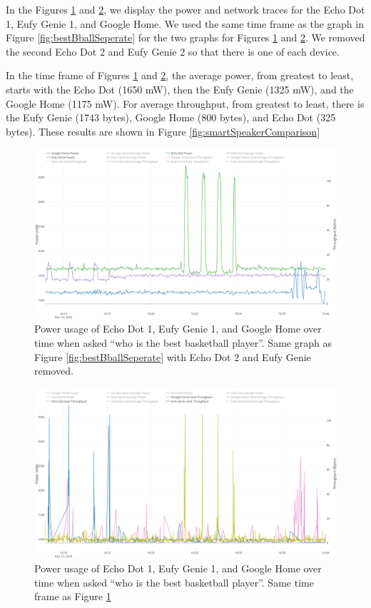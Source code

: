 In the Figures \ref{fig:smartSpeakerSeperate} and \ref{fig:smartSpeakerNetworkSeperate}, we display the power and network traces for the Echo Dot 1, Eufy Genie 1, and Google Home. We used the same time frame as the graph in Figure \ref{fig:bestBballSeperate} for the two graphs for Figures \ref{fig:smartSpeakerSeperate} and \ref{fig:smartSpeakerNetworkSeperate}. We removed the second Echo Dot 2 and Eufy Genie 2 so that there is one of each device.

In the time frame of Figures \ref{fig:smartSpeakerSeperate} and \ref{fig:smartSpeakerNetworkSeperate}, the average power, from greatest to least, starts with the Echo Dot (1650 mW), then the Eufy Genie (1325 mW), and the Google Home (1175 mW). For average throughput, from greatest to least, there is the Eufy Genie (1743 bytes), Google Home (800 bytes), and Echo Dot (325 bytes). These results are shown in Figure \ref{fig:smartSpeakerComparison}

\begin{figure}[H]
  \centering
  \includegraphics[width=1\textwidth]{figures/smartSpeakerSeperate.png}
  \caption{Power usage of Echo Dot 1, Eufy Genie 1, and Google Home over time when asked ``who is the best basketball player''. Same graph as Figure \ref{fig:bestBballSeperate} with Echo Dot 2 and Eufy Genie removed.}
  \label{fig:smartSpeakerSeperate}
\end{figure}

\begin{figure}[H]
  \centering
  \includegraphics[width=1\textwidth]{figures/smartSpeakerNetworkSeperate.png}
  \caption{Power usage of Echo Dot 1, Eufy Genie 1, and Google Home over time when asked ``who is the best basketball player''. Same time frame as Figure \ref{fig:smartSpeakerSeperate}}
  \label{fig:smartSpeakerNetworkSeperate}
\end{figure}

